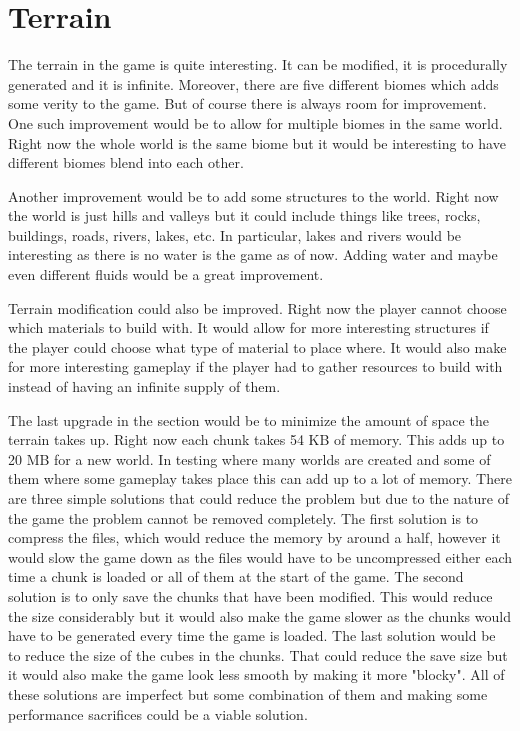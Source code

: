 \section{Terrain}
The terrain in the game is quite interesting.
It can be modified, it is procedurally generated and it is infinite.
Moreover, there are five different biomes which adds some verity to the game.
But of course there is always room for improvement.
One such improvement would be to allow for multiple biomes in the same world.
Right now the whole world is the same biome but it would be interesting to have different biomes blend into each other.

Another improvement would be to add some structures to the world.
Right now the world is just hills and valleys but it could include things like trees, rocks, buildings, roads, rivers, lakes, etc.
In particular, lakes and rivers would be interesting as there is no water is the game as of now.
Adding water and maybe even different fluids would be a great improvement.

Terrain modification could also be improved.
Right now the player cannot choose which materials to build with.
It would allow for more interesting structures if the player could choose what type of material to place where.
It would also make for more interesting gameplay if the player had to gather resources to build with instead of having an infinite supply of them.

The last upgrade in the section would be to minimize the amount of space the terrain takes up.
Right now each chunk takes 54 KB of memory.
This adds up to 20 MB for a new world.
In testing where many worlds are created and some of them where some gameplay takes place this can add up to a lot of memory.
There are three simple solutions that could reduce the problem but due to the nature of the game the problem cannot be removed completely.
The first solution is to compress the files, which would reduce the memory by around a half, however it would slow the game down as the files would have to be uncompressed either each time a chunk is loaded or all of them at the start of the game.
The second solution is to only save the chunks that have been modified.
This would reduce the size considerably but it would also make the game slower as the chunks would have to be generated every time the game is loaded.
The last solution would be to reduce the size of the cubes in the chunks.
That could reduce the save size but it would also make the game look less smooth by making it more "blocky".
All of these solutions are imperfect but some combination of them and making some performance sacrifices could be a viable solution.